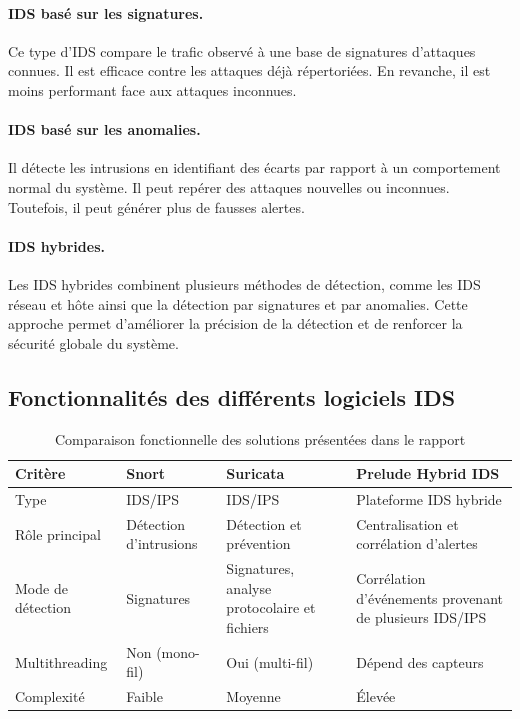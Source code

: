 \paragraph{IDS basé sur les signatures.} Ce type d'IDS compare le trafic observé à une base de signatures d'attaques connues. Il est efficace contre les attaques déjà répertoriées. En revanche, il est moins performant face aux attaques inconnues.

\paragraph{IDS basé sur les anomalies.} Il détecte les intrusions en identifiant des écarts par rapport à un comportement normal du système. Il peut repérer des attaques nouvelles ou inconnues. Toutefois, il peut générer plus de fausses alertes.

\paragraph{IDS hybrides.} Les IDS hybrides combinent plusieurs méthodes de détection, comme les IDS réseau et hôte ainsi que la détection par signatures et par anomalies. Cette approche permet d'améliorer la précision de la détection et de renforcer la sécurité globale du système.

\subsection{Fonctionnalités des différents logiciels IDS}
\begin{table}[htbp]\centering\small
\caption{Comparaison fonctionnelle des solutions présentées dans le rapport}\label{tab:fonctionnalites}
\begin{tabularx}{\linewidth}{@{}p{2.4cm}XXX@{}}\toprule
Critère & Snort & Suricata & Prelude Hybrid IDS\\\midrule
Type & IDS/IPS & IDS/IPS & Plateforme IDS hybride\\
Rôle principal & Détection d'intrusions & Détection et prévention & Centralisation et corrélation d'alertes\\
Mode de détection & Signatures & Signatures, analyse protocolaire et fichiers & Corrélation d'événements provenant de plusieurs IDS/IPS\\
Multithreading & Non (mono-fil) & Oui (multi-fil) & Dépend des capteurs\\
Complexité & Faible & Moyenne & Élevée\\\bottomrule
\end{tabularx}
\end{table}

